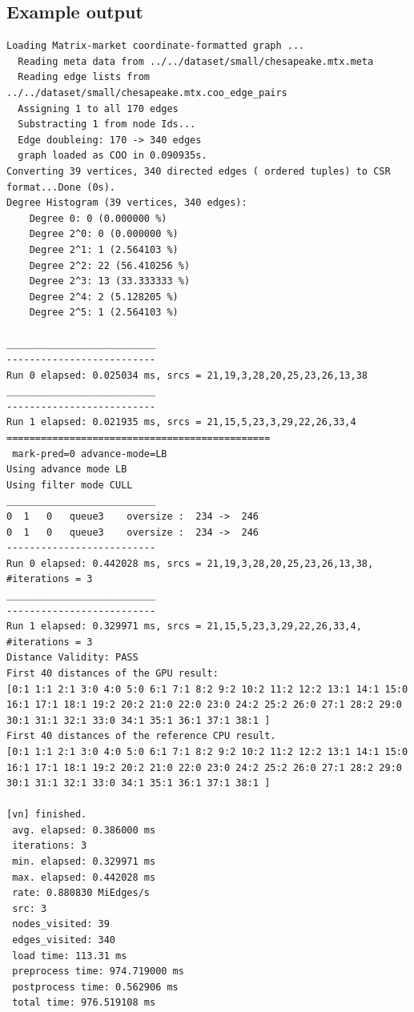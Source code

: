 \documentclass[10pt,oneside]{memoir}
\begin{document}
\hypertarget{example-output-5}{%
\subsection{Example output}\label{example-output-5}}

\begin{verbatim}
Loading Matrix-market coordinate-formatted graph ...
  Reading meta data from ../../dataset/small/chesapeake.mtx.meta
  Reading edge lists from ../../dataset/small/chesapeake.mtx.coo_edge_pairs
  Assigning 1 to all 170 edges
  Substracting 1 from node Ids...
  Edge doubleing: 170 -> 340 edges
  graph loaded as COO in 0.090935s.
Converting 39 vertices, 340 directed edges ( ordered tuples) to CSR format...Done (0s).
Degree Histogram (39 vertices, 340 edges):
    Degree 0: 0 (0.000000 %)
    Degree 2^0: 0 (0.000000 %)
    Degree 2^1: 1 (2.564103 %)
    Degree 2^2: 22 (56.410256 %)
    Degree 2^3: 13 (33.333333 %)
    Degree 2^4: 2 (5.128205 %)
    Degree 2^5: 1 (2.564103 %)

__________________________
--------------------------
Run 0 elapsed: 0.025034 ms, srcs = 21,19,3,28,20,25,23,26,13,38
__________________________
--------------------------
Run 1 elapsed: 0.021935 ms, srcs = 21,15,5,23,3,29,22,26,33,4
==============================================
 mark-pred=0 advance-mode=LB
Using advance mode LB
Using filter mode CULL
__________________________
0  1   0   queue3    oversize :  234 ->  246
0  1   0   queue3    oversize :  234 ->  246
--------------------------
Run 0 elapsed: 0.442028 ms, srcs = 21,19,3,28,20,25,23,26,13,38, #iterations = 3
__________________________
--------------------------
Run 1 elapsed: 0.329971 ms, srcs = 21,15,5,23,3,29,22,26,33,4, #iterations = 3
Distance Validity: PASS
First 40 distances of the GPU result:
[0:1 1:1 2:1 3:0 4:0 5:0 6:1 7:1 8:2 9:2 10:2 11:2 12:2 13:1 14:1 15:0 16:1 17:1 18:1 19:2 20:2 21:0 22:0 23:0 24:2 25:2 26:0 27:1 28:2 29:0 30:1 31:1 32:1 33:0 34:1 35:1 36:1 37:1 38:1 ]
First 40 distances of the reference CPU result.
[0:1 1:1 2:1 3:0 4:0 5:0 6:1 7:1 8:2 9:2 10:2 11:2 12:2 13:1 14:1 15:0 16:1 17:1 18:1 19:2 20:2 21:0 22:0 23:0 24:2 25:2 26:0 27:1 28:2 29:0 30:1 31:1 32:1 33:0 34:1 35:1 36:1 37:1 38:1 ]

[vn] finished.
 avg. elapsed: 0.386000 ms
 iterations: 3
 min. elapsed: 0.329971 ms
 max. elapsed: 0.442028 ms
 rate: 0.880830 MiEdges/s
 src: 3
 nodes_visited: 39
 edges_visited: 340
 load time: 113.31 ms
 preprocess time: 974.719000 ms
 postprocess time: 0.562906 ms
 total time: 976.519108 ms
\end{verbatim}
\end{document}
